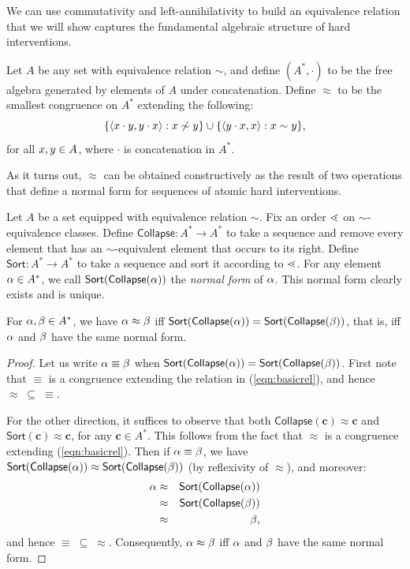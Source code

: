 \documentclass[twoside,11pt]{article}
\begin{document}
We can use commutativity and left-annihilativity to build an equivalence relation that we will show captures the fundamental algebraic structure of hard interventions.
\begin{definition}
Let $A$ be any set with equivalence relation $\sim$, and define $(A^*,\cdot)$ to be the free algebra generated by elements of $A$ under concatenation. Define $\approx$ to be the smallest congruence on $A^*$ extending the following: \begin{equation}\{\langle x\cdot y, y\cdot x \rangle : x \not \sim y\} \cup \{\langle y\cdot x, x \rangle: x \sim y\},\label{eqn:basicrel}\end{equation} for all $x,y \in A$, where $\cdot$ is concatenation in $A^*$. 
\end{definition}
As it turns out, $\approx$ can be obtained constructively as the result of two operations that define a normal form for sequences of atomic hard interventions.
\begin{definition}
    Let $A$ be a set equipped with equivalence relation $\sim$. Fix an order $\lessdot$ on $\sim$-equivalence classes.  Define $\mathsf{Collapse}: A^* \to A^*$ to take a sequence and remove every element that has an $\sim$-equivalent element that occurs to its right. Define $\mathsf{Sort}: A^* \to A^*$ to take a sequence and sort it according to $\lessdot$. For any element $\alpha \in A^*$, we call $\mathsf{Sort}(\mathsf{Collapse}(\alpha))$ the \emph{normal form} of $\alpha$. This normal form clearly exists and is unique.
\end{definition}
\begin{lemma} For $\alpha,\beta \in A^*$, we have $\alpha \approx \beta$ iff $\mathsf{Sort}(\mathsf{Collapse}(\alpha)) = \mathsf{Sort}(\mathsf{Collapse}(\beta))$, that is, iff $\alpha$ and $\beta$ have the same normal form. \label{lemma:equivs}
\end{lemma}
\begin{proof} Let us write $\alpha \equiv \beta$ when $\mathsf{Sort}(\mathsf{Collapse}(\alpha)) = \mathsf{Sort}(\mathsf{Collapse}(\beta))$. First note that $\equiv$ is a congruence extending the relation in (\ref{eqn:basicrel}), and hence $\approx \;\subseteq\; \equiv$. 

For the other direction, it suffices to observe that both  $\mathsf{Collapse}(\mathbf{c}) \approx \mathbf{c}$ and  $\mathsf{Sort}(\mathbf{c}) \approx \mathbf{c}$, for any $\mathbf{c} \in A^*$. This follows from the fact that $\approx$ is a congruence extending (\ref{eqn:basicrel}). Then if $\alpha \equiv \beta$, we have $\mathsf{Sort}(\mathsf{Collapse}(\alpha)) \approx \mathsf{Sort}(\mathsf{Collapse}(\beta))$ (by reflexivity of $\approx$), and moreover: \begin{eqnarray*}
    \alpha & \approx & \mathsf{Sort}(\mathsf{Collapse}(\alpha)) \\
    & \approx & \mathsf{Sort}(\mathsf{Collapse}(\beta)) \\
    & \approx & \beta,
\end{eqnarray*} and hence $\equiv \; \subseteq \; \approx$. Consequently, $\alpha \approx \beta$ iff $\alpha$ and $\beta$ have the same normal form. 
\end{proof}
\end{document}
